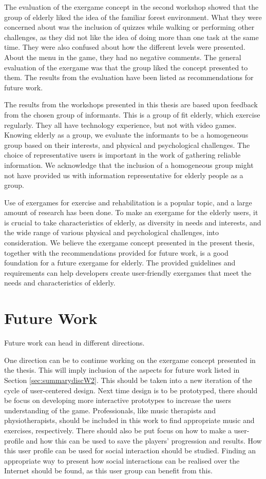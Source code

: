 The evaluation of the exergame concept in the second workshop showed that the group of elderly liked the idea of the familiar forest environment. What they were concerned about was the inclusion of quizzes while walking or performing other challenges, as they did not like the idea of doing more than one task at the same time. They were also confused about how the different levels were presented. About the menu in the game, they had no negative comments. The general evaluation of the exergame was that the group liked the concept presented to them. The results from the evaluation have been listed as recommendations for future work. 

The results from the workshops presented in this thesis are based upon feedback from the chosen group of informants. This is a group of fit elderly, which exercise regularly. They all have technology experience, but not with video games. Knowing elderly as a group, we evaluate the informants to be a homogeneous group based on their interests, and physical and psychological challenges. The choice of representative users is important in the work of gathering reliable information. We acknowledge that the inclusion of a homogeneous group might not have provided us with information representative for elderly people as a group. 

Use of exergames for exercise and rehabilitation is a popular topic, and a large amount of research has been done. To make an exergame for the elderly users, it is crucial to take characteristics of elderly, as diversity in needs and interests, and the wide range of various physical and psychological challenges, into consideration. We believe the exergame concept presented in the present thesis, together with the recommendations provided for future work, is a good foundation for a future exergame for elderly. The provided guidelines and requirements can help developers create user-friendly exergames that meet the needs and characteristics of elderly.
 
\section{Future Work}

Future work can head in different directions. 

One direction can be to continue working on the exergame concept presented in the thesis. This will imply inclusion of the aspects for future work listed in Section \ref{sec:summarydiscW2}. This should be taken into a new iteration of the cycle of user-centered design. Next time design is to be prototyped, there should be focus on developing more interactive prototypes to increase the users understanding of the game. Professionals, like music therapists and physiotherapists, should be included in this work to find appropriate music and exercises, respectively. There should also be put focus on how to make a user-profile and how this can be used to save the players' progression and results. How this user profile can be used for social interaction should be studied. Finding an appropriate way to present how social interactions can be realised over the Internet should be found, as this user group can benefit from this. 

